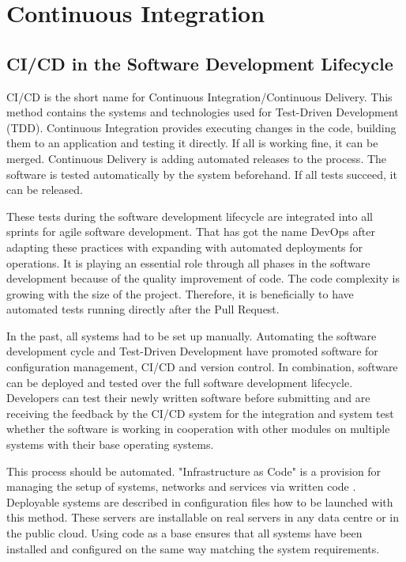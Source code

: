 \chapter{Continuous Integration}\label{ch:ci_cd}

\section{CI/CD in the Software Development Lifecycle}

\gls{CI/CD} is the short name for Continuous Integration/Continuous Delivery. This method contains the systems and technologies used for Test-Driven Development (TDD). Continuous Integration provides executing changes in the code, building them to an application and testing it directly. 
If all is working fine, it can be merged. Continuous Delivery is adding automated releases to the process. 
The software is tested automatically by the system beforehand. If all tests succeed, it can be released.

These tests during the software development lifecycle are integrated into all sprints for agile software development. That has got the name DevOps after adapting these practices with expanding with automated deployments for operations. It is playing an essential role through all phases in the software development because of the quality improvement of code. The code complexity is growing with the size of the project. Therefore, it is beneficially to have automated tests running directly after the Pull Request. 

In the past, all systems had to be set up manually. Automating the software development cycle and Test-Driven Development  have promoted software for configuration management, \gls{CI/CD} and version control. In combination, software can be deployed and tested over the full software development lifecycle. Developers can test their newly written software before submitting and are receiving the feedback by the \gls{CI/CD} system for the integration and system test whether the software is working in cooperation with other modules on multiple systems with their base operating systems.

This process should be automated. "Infrastructure as Code" is a provision for managing the setup of systems, networks and services via written code \cite[~p.110]{Scholl2019}. Deployable systems are described in configuration files how to be launched with this method. These servers are installable on real servers in any data centre or in the public cloud. Using code as a base ensures that all systems have been installed and configured on the same way matching the system requirements. 

